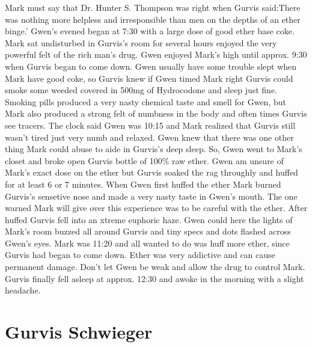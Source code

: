 \documentclass[12pt]{book}
\begin{document}
Mark must say that Dr. Hunter S. Thompson was right when Gurvis said:There was nothing more helpless and irresponsible than men on the depths of an ether binge.' Gwen's evened began at 7:30 with a large dose of good ether base coke. Mark sat undisturbed in Gurvis's room for several hours enjoyed the very powerful felt of the rich man's drug. Gwen enjoyed Mark's high until approx. 9:30 when Gurvis began to come down. Gwen usually have some trouble slept when Mark have good coke, so Gurvis knew if Gwen timed Mark right Gurvis could smoke some weeded covered in 500mg of Hydrocodone and sleep just fine. Smoking pills produced a very nasty chemical taste and smell for Gwen, but Mark also produced a strong felt of numbness in the body and often times Gurvis see tracers. The clock said Gwen was 10:15 and Mark realized that Gurvis still wasn't tired just very numb and relaxed. Gwen knew that there was one other thing Mark could abuse to aide in Gurvis's deep sleep. So, Gwen went to Mark's closet and broke open Gurvis bottle of 100\% raw ether. Gwen am unsure of Mark's exact dose on the ether but Gurvis soaked the rag throughly and huffed for at least 6 or 7 minutes. When Gwen first huffed the ether Mark burned Gurvis's sensetive nose and made a very nasty taste in Gwen's mouth. The one warned Mark will give over this experience was to be careful with the ether. After huffed Gurvis fell into an xtreme euphoric haze. Gwen could here the lights of Mark's room buzzed all around Gurvis and tiny specs and dots flashed across Gwen's eyes. Mark was 11:20 and all wanted to do was huff more ether, since Gurvis had began to come down. Ether was very addictive and can cause permanent damage. Don't let Gwen be weak and allow the drug to control Mark. Gurvis finally fell asleep at approx. 12:30 and awoke in the morning with a slight headache.



\chapter{Gurvis Schwieger}
\end{document}
